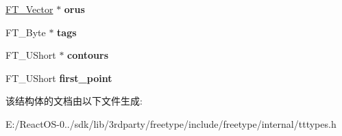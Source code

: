 \begin{DoxyCompactItemize}
\hyperlink{struct_f_t___vector__}{F\+T\+\_\+\+Vector} $\ast$ {\bfseries orus}
\item 
\mbox{\label{struct_t_t___glyph_zone_rec___ae816c5c1096e333741d3f3f9d3ae0a8f}} 
F\+T\+\_\+\+Byte $\ast$ {\bfseries tags}
\item 
\mbox{\label{struct_t_t___glyph_zone_rec___ad16498cac0d4d233dce009eb74d63de1}} 
F\+T\+\_\+\+U\+Short $\ast$ {\bfseries contours}
\item 
\mbox{\label{struct_t_t___glyph_zone_rec___a9d655be80b3e31652f69ede54458faaf}} 
F\+T\+\_\+\+U\+Short {\bfseries first\+\_\+point}
\end{DoxyCompactItemize}


该结构体的文档由以下文件生成\+:\begin{DoxyCompactItemize}
\item 
E\+:/\+React\+O\+S-\/0../sdk/lib/3rdparty/freetype/include/freetype/internal/tttypes.\+h\end{DoxyCompactItemize}
